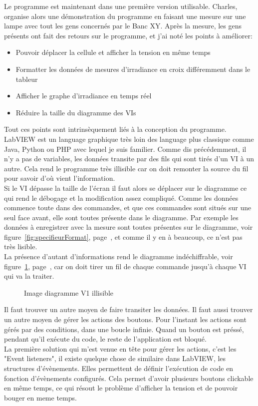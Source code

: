 \documentclass[12pt]{article}
\begin{document}
Le programme est maintenant dans une première version utilisable.
Charles, organise alors une démonstration du programme en faisant une mesure sur une lampe avec tout les gens concernés par le Banc XY.
Après la mesure, les gens présents ont fait des retours sur le programme, et j'ai noté les points à améliorer:
\begin{itemize}
	\item Pouvoir déplacer la cellule et afficher la tension en même temps
	\item Formatter les données de mesures d'irradiance en croix différemment dans le tableur
	\item Afficher le graphe d'irradiance en temps réel
	\item Réduire la taille du diagramme des VIs
\end{itemize}
Tout ces points sont intrinsèquement liés à la conception du programme.\\
LabVIEW est un language graphique très loin des language plus classique comme Java, Python ou PHP avec lequel je suis familier.
Comme dis précédemment, il n'y a pas de variables, les données transite par des fils qui sont tirés d'un VI à un autre.
Cela rend le programme très illisible car on doit remonter la source du fil pour savoir d'où vient l'information.\\
Si le VI dépasse la taille de l'écran il faut alors se déplacer sur le diagramme ce qui rend le débogage et la modification assez compliqué.
Comme les données commence toute dans des commandes, et que ces commandes sont situés sur une seul face avant, elle sont toutes présente dans le diagramme.
Par exemple les données à enregistrer avec la mesure sont toutes présentes sur le diagramme, voir figure~\ref{fig:specifieurFormat}, page~\pageref{fig:specifieurFormat}, et comme il y en à beaucoup, ce n'est pas très lisible.\\
La présence d'autant d'informations rend le diagramme indéchiffrable, voir figure~\ref{fig:diagrammeV1}, page~\pageref{fig:diagrammeV1}, car on doit tirer un fil de chaque commande jusqu'à chaque VI qui va la traiter.
\begin{figure}[p]
	\centering
	\caption{Image diagramme V1 illisible}
	\label{fig:diagrammeV1}
\end{figure}
Il faut trouver un autre moyen de faire transiter les données.
Il faut aussi trouver un autre moyen de gérer les actions des boutons.
Pour l'instant les actions sont gérés par des conditions, dans une boucle infinie. Quand un bouton est préssé, pendant qu'il exécute du code, le reste de l'application est bloqué.\\
La première solution qui m'est venue en tête pour gérer les actions, c'est les "Event listeners", il existe quelque chose de similaire dans LabVIEW, les structures d'évènements.
Elles permettent de définir l'exécution de code en fonction d'évènements configurés.
Cela permet d'avoir plusieurs boutons clickable en même temps, ce qui résout le problème d'afficher la tension et de pouvoir bouger en meme temps.
\end{document}
